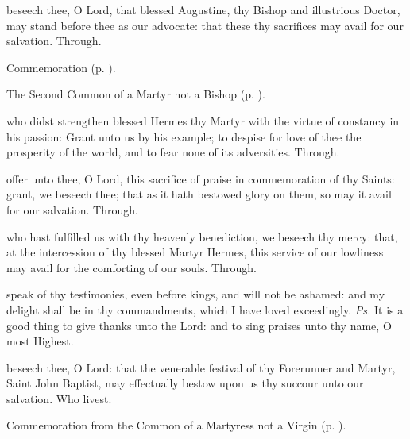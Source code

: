 
\postcommunion
{} beseech thee, O Lord, that blessed Augustine, thy Bishop and illustrious Doctor, may stand before thee as our advocate: that these thy sacrifices may avail for our salvation. Through.

\begin{rubric}
    Commemoration  (p. \pageref{HermesPostcommunion}).
\end{rubric}



\begin{rubric}
	The Second Common of a Martyr not a Bishop (p. \pageref{CommonMartyrNotBishopII}).
\end{rubric}

\collect\label{HermesCollect}
 who didst strengthen blessed Hermes thy Martyr with the virtue of constancy in his passion: Grant unto us by his example; to despise for love of thee the prosperity of the world, and to fear none of its adversities. Through.

\secret\label{HermesSecret}
 offer unto thee, O Lord, this sacrifice of praise in commemoration of thy Saints: grant, we beseech thee; that as it hath bestowed glory on them, so may it avail for our salvation. Through.

\postcommunion\label{HermesPostcommunion}
 who hast fulfilled us with thy heavenly benediction, we beseech thy mercy: that, at the intercession of thy blessed Martyr Hermes, this service of our lowliness may avail for the comforting of our souls. Through.


\clearpage
{}

\introit
{} speak of thy testimonies, even before kings, and will not be ashamed: and my delight shall be in thy commandments, which I have loved exceedingly. \textit{Ps.} It is a good thing to give thanks unto the Lord: and to sing praises unto thy name, O most Highest.

\collect
{} beseech thee, O Lord: that the venerable festival of thy Forerunner and Martyr, Saint John Baptist, may effectually bestow upon us thy succour unto our salvation. Who livest.
\begin{rubric}
	 Commemoration  from the Common of a Martyress not a Virgin (p. \pageref{CommonMartyrNotVirgin}).
\end{rubric}

